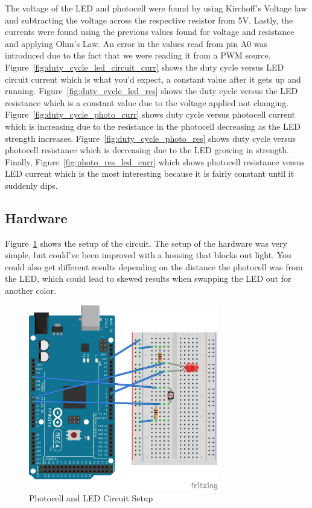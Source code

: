 \documentclass[12pt,titlepage]{article}
\begin{document}
The voltage of the LED and photocell were found by using Kirchoff's Voltage law and subtracting the voltage
across the respective resistor from 5V. Lastly, the currents were found using the previous values found for
voltage and resistance and applying Ohm's Law. An error in the values read from pin A0 was introduced due to
the fact that we were reading it from a PWM source. Figure~\ref{fig:duty_cycle_led_circuit_curr} shows the
duty cycle versus LED circuit current which is what you'd expect, a constant value after it gets up and
running. Figure~\ref{fig:duty_cycle_led_res} shows the duty cycle versus the LED resistance which is a
constant value due to the voltage applied not changing. Figure~\ref{fig:duty_cycle_photo_curr}
shows duty cycle versus photocell current which is increasing due to the resistance in the photocell
decreasing as the LED strength increases. Figure~\ref{fig:duty_cycle_photo_res} shows duty cycle versus
photocell resistance which is decreasing due to the LED growing in strength. Finally,
Figure~\ref{fig:photo_res_led_curr} which shows photocell resistance versus LED current which is the most
interesting because it is fairly constant until it suddenly dips.
\subsection{Hardware}
Figure~\ref{fig:lab_3_schem} shows the setup of the circuit. The setup of the hardware was very simple, but
could've been improved with a housing that blocks out light. You could also get different results depending
on the distance the photocell was from the LED, which could lead to skewed results when swapping the LED out
for another color.
\begin{figure}[!htb]
    \centering
    \includegraphics[width=3.25in]{lab_3/schematic.png}
    \caption{Photocell and LED Circuit Setup}\label{fig:lab_3_schem}
\end{figure}
\end{document}

